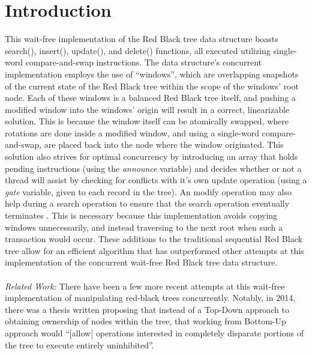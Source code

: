 \documentclass[12pt,a4paper]{article}
\begin{document}
\section{Introduction}
This wait-free implementation of the Red Black tree data structure boasts search(), insert(), update(), and delete() functions, all executed utilizing single-word compare-and-swap instructions. The data structure's concurrent implementation employs the use of ``windows'', which are overlapping snapshots of the current state of the Red Black tree within the scope of the windows' root node. Each of these windows is a balanced Red Black tree itself, and pushing a modified window into the windows' origin will result in a correct, linearizable solution. This is because the window itself can be atomically swapped, where rotations are done inside a modified window, and using a single-word compare-and-swap, are placed back into the node where the window originated. This solution also strives for optimal concurrency by introducing an array that holds pending instructions (using the \textit{announce} variable) and decides whether or not a thread will assist by checking for conflicts with it's own update operation (using a \textit{gate} variable, given to each record in the tree). An modify operation may also help during a search operation to ensure that the search operation eventually terminates \cite{RedBlackDoc}. This is necessary because this implementation avoids copying windows unnecessarily, and instead traversing to the next root when such a transaction would occur. These additions to the traditional sequential Red Black tree allow for an efficient algorithm that has outperformed other attempts at this implementation of the concurrent wait-free Red Black tree data structure. \\ \\
\textit{Related Work: } There have been a few more recent attempts at this wait-free implementation of manipulating red-black trees concurrently. Notably, in 2014, there was a thesis written proposing that instead of a Top-Down approach to obtaining ownership of nodes within the tree, that working from Bottom-Up approach would ``[allow] operations interested in completely disparate portions of the tree to execute entirely uninhibited''\cite{BottomUpRBD}.
\end{document}

